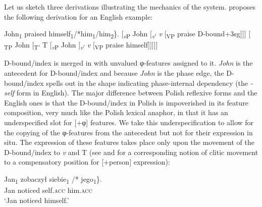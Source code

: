 \documentclass[output=paper,modfonts,nonflat
]{langsci/langscibook}
\begin{document}
Let us sketch three derivations illustrating the mechanics of the system. \cite{safir2014} proposes the following derivation for an English example:

\ea\label{ex:witkos:9}
\ea John\textsubscript{1} praised \minsp{\{} himself\textsubscript{1}/*him\textsubscript{1}/him\textsubscript{2}\}.
\ex $[$\textsubscript{\textit{v}P} John $[$\textsubscript{\textit{v}$'$} \textit{v} $[$\textsubscript{VP} praise D-bound+3sg$]]]$
\ex $[$\textsubscript{TP} John $[$\textsubscript{T$'$} T $[$\textsubscript{\textit{v}P} John $[$\textsubscript{\textit{v}$'$} \textit{v} $[$\textsubscript{VP} praise himself$]]]]]$
\z\z


\noindent D-bound/index is merged in with unvalued φ-features assigned to it. \textit{John} is the antecedent for D-bound/index and because \textit{John} is the phase edge, the D-bound/index spells out in the shape indicating phase-internal dependency (the \textit{-self} form in English). The major difference between Polish reflexive forms and the English ones is that the D-bound/index in Polish is impoverished in its feature composition, very much like the Polish lexical anaphor, in that it has an underspecified slot for [$+$φ] features. We take this underspecification to allow for the copying of the φ-features from the antecedent but not for their expression in situ. The expression of these features takes place only upon the movement of the D-bound/index to \textit{v} and T (see \citealt{bejar2003} and \citealt{franks2017} for a corresponding notion of clitic movement to a compensatory position for $[+$person$]$ expression):

\ea\label{ex:witkos:10}
\ea \gll Jan\textsubscript{1} zobaczył \minsp{\{} siebie\textsubscript{1} /*\hspace{-2pt} jego\textsubscript{1}\}. \label{ex:witkos:10a}\\
Jan noticed {} self.\textsc{acc} {} him.\textsc{acc}\\
\glt `Jan noticed himself.'

\end{document}
